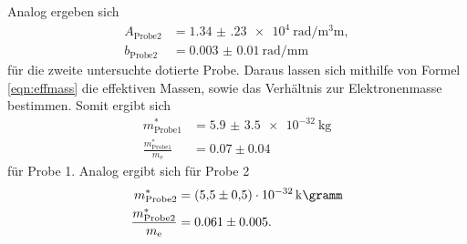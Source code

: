    Analog ergeben sich 
   \begin{align}
    A_\text{Probe2} &= \SI{1.34(23)e4}{\radian\per\cubic\milli\meter}, \\
     b_\text{Probe2} &= \SI{0.003(10)}{\radian\per\milli\meter}
   \end{align} \noindent       
    für die zweite untersuchte dotierte Probe. Daraus lassen sich mithilfe von Formel \ref{eqn:effmass} 
    die effektiven Massen, sowie das Verhältnis zur Elektronenmasse bestimmen. Somit ergibt sich 
    \begin{align}
        m_\text{Probe1}^* &= \SI{5.9(35)e-32}{\kilo\gram} \\
        \frac{m_\text{Probe1}^*}{m_\text{e}} &= 0.07 \pm 0.04 
    \end{align} \noindent 
    für Probe 1. Analog ergibt sich für Probe 2
    \begin{align}
        m_\text{Probe2}^* &= \SI{5.5(5)e-32}{\kilo\gramm} \\
        \frac{m_\text{Probe2}^*}{m_\text{e}} &= 0.061 \pm 0.005.
    \end{align} \noindent 
    